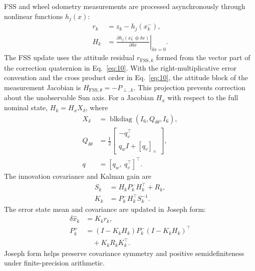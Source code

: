 \documentclass[]{IAC_style}
\begin{document}
FSS and wheel odometry measurements are processed asynchronously through nonlinear functions $h_j(x)$:
\begin{equation}
\tag{25}\label{eq:25}
\begin{aligned}r_k&=z_k-h_j(x_k^-),\\H_k&=\left.\frac{\partial h_j(x_k^-\oplus\delta x)}{\partial\delta x}\right|_{\delta x=0}.\end{aligned}
\end{equation}
The FSS update uses the attitude residual $r_{\mathrm{FSS},k}$ formed from the vector part of the correction quaternion in Eq.~\eqref{eq:10}. With the right-multiplicative error convention and the cross product order in Eq.~\eqref{eq:10}, the attitude block of the measurement Jacobian is $H_{\mathrm{FSS},\theta}=-P_{\perp,k}$. This projection prevents correction about the unobservable Sun axis. For a Jacobian $H_x$ with respect to the full nominal state, $H_k=H_xX_\delta$, where
\begin{equation}
\tag{26}\label{eq:26}
\begin{aligned}X_\delta&=\operatorname{blkdiag}(I_6,Q_{\delta\theta},I_6),\\Q_{\delta\theta}&=\frac12\begin{bmatrix}-q_v^\top\\q_wI+[q_v]_\times\end{bmatrix},\\q&=[q_w,\ q_v^\top]^\top.\end{aligned}
\end{equation}
The innovation covariance and Kalman gain are
\begin{equation}
\tag{27}\label{eq:27}
\begin{aligned}S_k&=H_kP_k^-H_k^\top+R_k,\\K_k&=P_k^-H_k^\top S_k^{-1}.\end{aligned}
\end{equation}
The error state mean and covariance are updated in Joseph form:
\begin{equation}
\tag{28}\label{eq:28}
\begin{aligned}
\delta\hat x_k&=K_kr_k,\\
P_k^+
  &=(I-K_kH_k)P_k^-(I-K_kH_k)^\top\\
  &\quad{}+K_kR_kK_k^\top.
\end{aligned}
\end{equation}
Joseph form helps preserve covariance symmetry and positive semidefiniteness under finite-precision arithmetic.
\end{document}
